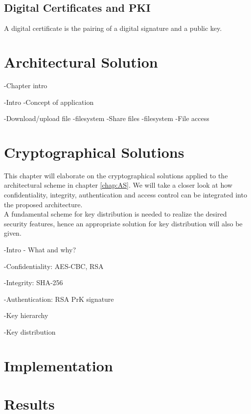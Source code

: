 \documentclass[english,12pt,a4paper]{book}
\begin{document}
\section{Digital Certificates and PKI}
A digital certificate is the pairing of a digital signature and a public key. 


\chapter{Architectural Solution}
-Chapter intro

-Intro
	 -Concept of application

-Download/upload file
	-filesystem
-Share files
	-filesystem
-File access


\chapter{Cryptographical Solutions}
This chapter will elaborate on the cryptographical solutions applied to the
architectural scheme in chapter \ref{chap:AS}. We will take a closer look at
how confidentiality, integrity, authentication and access control can be 
integrated into the proposed architecture.\\

A fundamental scheme for key distribution is needed to realize the desired
security features, hence an appropriate solution for key distribution will
also be given.

-Intro - What and why?

{
-Confidentiality: AES-CBC, RSA

-Integrity: SHA-256

-Authentication: RSA PrK signature

-Key hierarchy

-Key distribution
}

\chapter{Implementation}

\chapter{Results}
\end{document}
